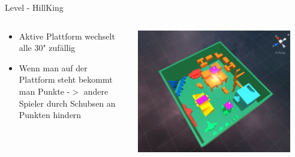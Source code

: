 \documentclass[xcolor=dvipsnames]{beamer}
\begin{document}
\begin{frame}{Level - HillKing}
\begin{columns}
\begin{column}{0.5\textwidth}
	\begin{itemize}
		\item Aktive Plattform wechselt alle 30" zufällig 
		\item Wenn man auf der Plattform steht bekommt man Punkte -$>$ andere Spieler durch Schubsen an Punkten hindern 
	\end{itemize}
\end{column}
\begin{column}{0.5\textwidth} 
	\begin{center}
		\includegraphics[width=0.9\textwidth]{Level_HillKing_view.png}
	\end{center}
\end{column}
\end{columns}

\end{frame}
\end{document}
